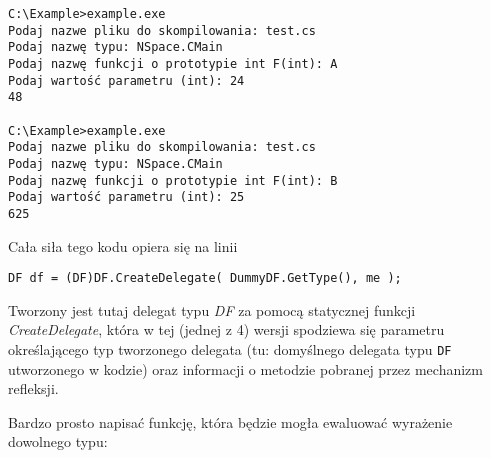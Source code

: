 \begin{scriptsize}
\begin{verbatim}
C:\Example>example.exe
Podaj nazwe pliku do skompilowania: test.cs
Podaj nazwę typu: NSpace.CMain
Podaj nazwę funkcji o prototypie int F(int): A
Podaj wartość parametru (int): 24
48

C:\Example>example.exe
Podaj nazwe pliku do skompilowania: test.cs
Podaj nazwę typu: NSpace.CMain
Podaj nazwę funkcji o prototypie int F(int): B
Podaj wartość parametru (int): 25
625
\end{verbatim}
\end{scriptsize}

Cała siła tego kodu opiera się na linii

\begin{scriptsize}
\begin{verbatim}
DF df = (DF)DF.CreateDelegate( DummyDF.GetType(), me );
\end{verbatim}
\end{scriptsize}

Tworzony jest tutaj delegat typu {\em DF} za pomocą statycznej funkcji {\em CreateDelegate}, która w tej
(jednej z 4) wersji spodziewa się parametru określającego typ tworzonego delegata (tu: domyślnego
delegata typu {\tt DF} utworzonego w kodzie) oraz informacji o metodzie pobranej przez mechanizm refleksji.

Bardzo prosto napisać funkcję, która będzie mogła ewaluować wyrażenie dowolnego typu:

